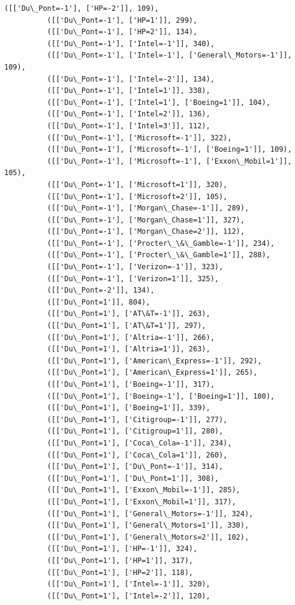 \documentclass[11pt]{article}
\begin{document}
\begin{Verbatim}[commandchars=\\\{\}]
          ([['Du\_Pont=-1'], ['HP=-2']], 109),
          ([['Du\_Pont=-1'], ['HP=1']], 299),
          ([['Du\_Pont=-1'], ['HP=2']], 134),
          ([['Du\_Pont=-1'], ['Intel=-1']], 340),
          ([['Du\_Pont=-1'], ['Intel=-1'], ['General\_Motors=-1']], 109),
          ([['Du\_Pont=-1'], ['Intel=-2']], 134),
          ([['Du\_Pont=-1'], ['Intel=1']], 338),
          ([['Du\_Pont=-1'], ['Intel=1'], ['Boeing=1']], 104),
          ([['Du\_Pont=-1'], ['Intel=2']], 136),
          ([['Du\_Pont=-1'], ['Intel=3']], 112),
          ([['Du\_Pont=-1'], ['Microsoft=-1']], 322),
          ([['Du\_Pont=-1'], ['Microsoft=-1'], ['Boeing=1']], 109),
          ([['Du\_Pont=-1'], ['Microsoft=-1'], ['Exxon\_Mobil=1']], 105),
          ([['Du\_Pont=-1'], ['Microsoft=1']], 320),
          ([['Du\_Pont=-1'], ['Microsoft=2']], 105),
          ([['Du\_Pont=-1'], ['Morgan\_Chase=-1']], 289),
          ([['Du\_Pont=-1'], ['Morgan\_Chase=1']], 327),
          ([['Du\_Pont=-1'], ['Morgan\_Chase=2']], 112),
          ([['Du\_Pont=-1'], ['Procter\_\&\_Gamble=-1']], 234),
          ([['Du\_Pont=-1'], ['Procter\_\&\_Gamble=1']], 288),
          ([['Du\_Pont=-1'], ['Verizon=-1']], 323),
          ([['Du\_Pont=-1'], ['Verizon=1']], 325),
          ([['Du\_Pont=-2']], 134),
          ([['Du\_Pont=1']], 804),
          ([['Du\_Pont=1'], ['AT\&T=-1']], 263),
          ([['Du\_Pont=1'], ['AT\&T=1']], 297),
          ([['Du\_Pont=1'], ['Altria=-1']], 266),
          ([['Du\_Pont=1'], ['Altria=1']], 263),
          ([['Du\_Pont=1'], ['American\_Express=-1']], 292),
          ([['Du\_Pont=1'], ['American\_Express=1']], 265),
          ([['Du\_Pont=1'], ['Boeing=-1']], 317),
          ([['Du\_Pont=1'], ['Boeing=-1'], ['Boeing=1']], 100),
          ([['Du\_Pont=1'], ['Boeing=1']], 339),
          ([['Du\_Pont=1'], ['Citigroup=-1']], 277),
          ([['Du\_Pont=1'], ['Citigroup=1']], 280),
          ([['Du\_Pont=1'], ['Coca\_Cola=-1']], 234),
          ([['Du\_Pont=1'], ['Coca\_Cola=1']], 260),
          ([['Du\_Pont=1'], ['Du\_Pont=-1']], 314),
          ([['Du\_Pont=1'], ['Du\_Pont=1']], 308),
          ([['Du\_Pont=1'], ['Exxon\_Mobil=-1']], 285),
          ([['Du\_Pont=1'], ['Exxon\_Mobil=1']], 317),
          ([['Du\_Pont=1'], ['General\_Motors=-1']], 324),
          ([['Du\_Pont=1'], ['General\_Motors=1']], 330),
          ([['Du\_Pont=1'], ['General\_Motors=2']], 102),
          ([['Du\_Pont=1'], ['HP=-1']], 324),
          ([['Du\_Pont=1'], ['HP=1']], 317),
          ([['Du\_Pont=1'], ['HP=2']], 118),
          ([['Du\_Pont=1'], ['Intel=-1']], 320),
          ([['Du\_Pont=1'], ['Intel=-2']], 120),

\end{Verbatim}
\end{document}
